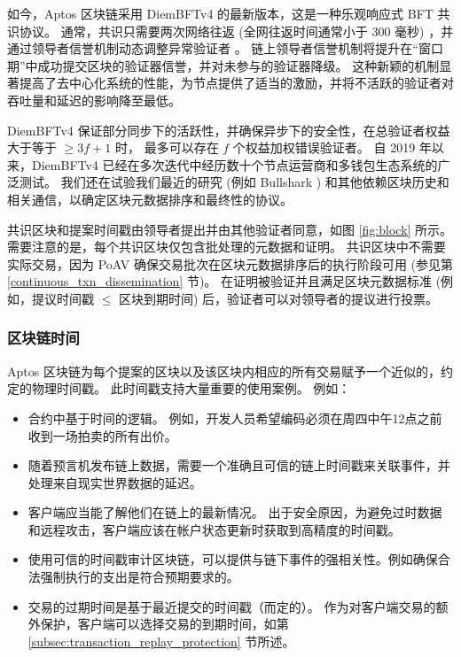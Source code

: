 \documentclass{article}
\begin{document}
如今，Aptos 区块链采用 DiemBFTv4 \cite{diembft_v4} 的最新版本，这是一种乐观响应式 BFT 共识协议。 通常，共识只需要两次网络往返 (全网往返时间通常小于 300 毫秒) ，并通过领导者信誉机制动态调整异常验证者 \cite{be_aware}。 链上领导者信誉机制将提升在“窗口期”中成功提交区块的验证器信誉，并对未参与的验证器降级。 这种新颖的机制显著提高了去中心化系统的性能，为节点提供了适当的激励，并将不活跃的验证者对吞吐量和延迟的影响降至最低。

DiemBFTv4 保证部分同步下的活跃性，并确保异步下的安全性，在总验证者权益大于等于 $\geq 3f+1$ 时， 最多可以存在 $f$ 个权益加权错误验证者。 自 2019 年以来，DiemBFTv4 已经在多次迭代中经历数十个节点运营商和多钱包生态系统的广泛测试。 我们还在试验我们最近的研究 (例如 Bullshark \cite{bullshark}) 和其他依赖区块历史和相关通信，以确定区块元数据排序和最终性的协议。

共识区块和提案时间戳由领导者提出并由其他验证者同意，如图 \ref{fig:block} 所示。 需要注意的是，每个共识区块仅包含批处理的元数据和证明。 共识区块中不需要实际交易，因为 PoAV 确保交易批次在区块元数据排序后的执行阶段可用 (参见第 \ref{continuous_txn_dissemination} 节)。 在证明被验证并且满足区块元数据标准 (例如，提议时间戳 $\le$ 区块到期时间) 后，验证者可以对领导者的提议进行投票。

\subsubsection{区块链时间}
\label{subsubsec:blockchain_time}

Aptos 区块链为每个提案的区块以及该区块内相应的所有交易赋予一个近似的，约定的物理时间戳。 此时间戳支持大量重要的使用案例。 例如：

\begin{itemize}
\item 合约中基于时间的逻辑。 例如，开发人员希望编码必须在周四中午12点之前收到一场拍卖的所有出价。
\item 随着预言机发布链上数据，需要一个准确且可信的链上时间戳来关联事件，并处理来自现实世界数据的延迟。

\item 客户端应当能了解他们在链上的最新情况。 出于安全原因，为避免过时数据和远程攻击，客户端应该在帐户状态更新时获取到高精度的时间戳。

\item 使用可信的时间戳审计区块链，可以提供与链下事件的强相关性。例如确保合法强制执行的支出是符合预期要求的。
\item 交易的过期时间是基于最近提交的时间戳（而定的）。 作为对客户端交易的额外保护，客户端可以选择交易的到期时间，如第 \ref{subsec:transaction_replay_protection} 节所述。

\end{itemize}
\end{document}
